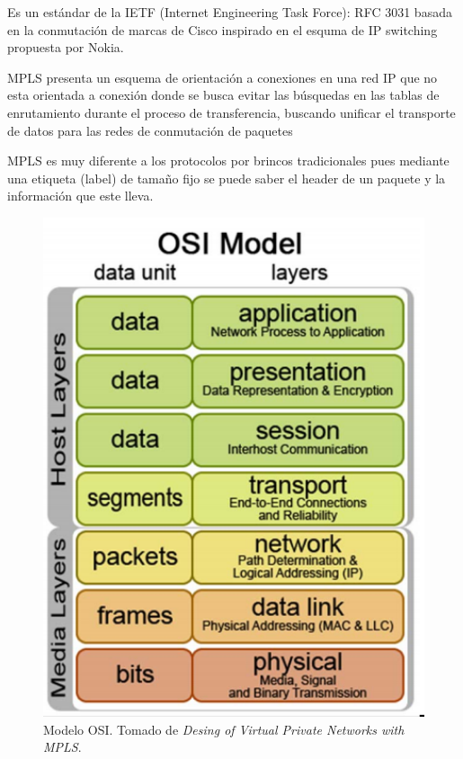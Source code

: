 \documentclass[10pt,journal,compsoc]{IEEEtran}
\begin{document}
Es un estándar de la IETF (Internet Engineering Task Force): RFC 3031 basada en la conmutación de marcas de Cisco inspirado en el esquma de IP switching propuesta por Nokia. 

MPLS presenta un esquema de orientación a conexiones en una red IP que no esta orientada a conexión donde se busca evitar las búsquedas en las tablas de enrutamiento durante el proceso de transferencia, buscando unificar el transporte de datos para las redes de conmutación de paquetes

MPLS es muy diferente a los protocolos por brincos tradicionales pues mediante una etiqueta (label) de tamaño fijo se puede saber el header de un paquete y la información que este lleva. 


\begin{figure}[h]
    \center
    \includegraphics[width=15cm]{osi}
    \caption{Modelo OSI. Tomado de  \emph{Desing of Virtual Private Networks with MPLS}\cite{rexford}.}
    \label{fig:tradicitional-architecture}
\end{figure}
\end{document}
